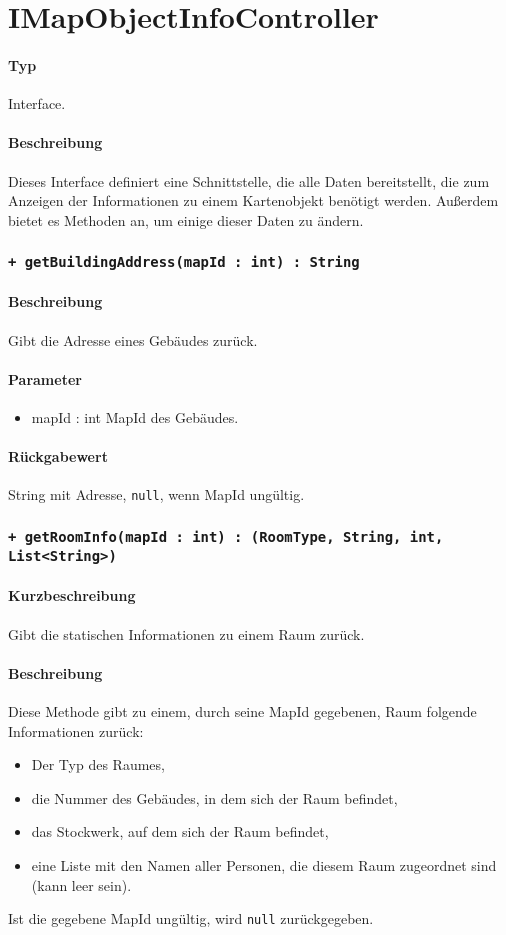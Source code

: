 \section{IMapObjectInfoController}
\paragraph*{Typ}
Interface.
\paragraph*{Beschreibung}
Dieses Interface definiert eine Schnittstelle, die alle Daten bereitstellt, 
die zum Anzeigen der Informationen zu einem Kartenobjekt benötigt werden. 
Außerdem bietet es Methoden an, um einige dieser Daten zu ändern.

\subsubsection{\texttt{+ getBuildingAddress(mapId : int) : String}}%
\paragraph*{Beschreibung}
Gibt die Adresse eines Gebäudes zurück.
\paragraph*{Parameter}
\begin{itemize}
    \item mapId : int MapId des Gebäudes.
\end{itemize}
\paragraph*{Rückgabewert}
String mit Adresse, \texttt{null}, wenn MapId ungültig.

\subsubsection{\texttt{+ getRoomInfo(mapId : int) : (RoomType, String, int, List<String>)}}%
\paragraph*{Kurzbeschreibung}
Gibt die statischen Informationen zu einem Raum zurück.
\paragraph*{Beschreibung}
Diese Methode gibt zu einem, durch seine MapId gegebenen, Raum folgende Informationen zurück:
\begin{itemize}
    \item Der Typ des Raumes,
    \item die Nummer des Gebäudes, in dem sich der Raum befindet,
    \item das Stockwerk, auf dem sich der Raum befindet,
    \item eine Liste mit den Namen aller Personen, die diesem Raum zugeordnet sind (kann leer sein).
\end{itemize}
Ist die gegebene MapId ungültig, wird \texttt{null} zurückgegeben.
